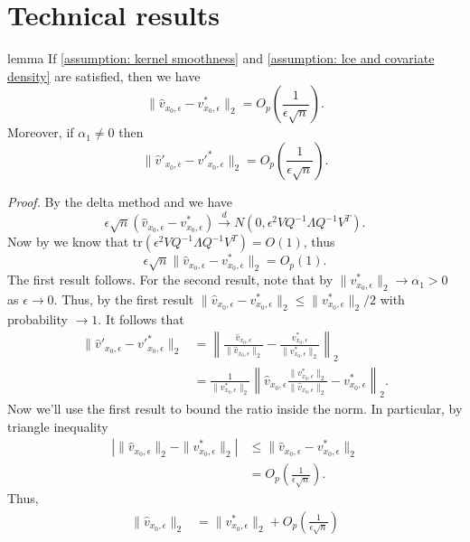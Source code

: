 \documentclass[11pt]{article}
\begin{document}
\section{Technical results}

\begin{restatable}{lemma}{} \label{lemma: scaled high prob bound for velocity}
    If \cref{assumption: kernel smoothness} and \cref{assumption: lce and covariate density} are satisfied, then we have 
    \[\|\hat{v}_{x_0, \epsilon} - v^*_{x_0, \epsilon}\|_2 = O_p\left(\frac{1}{\epsilon\sqrt{n}}\right).\]
    Moreover, if $\alpha_1 \neq 0$ then 
    \[\|\hat{v}'_{x_0, \epsilon} - v'^*_{x_0, \epsilon}\|_2 = O_p\left(\frac{1}{\epsilon\sqrt{n}}\right).\]
\end{restatable}
\noindent \textit{Proof.} By the delta method and  we have
\[\epsilon\sqrt{n}(\hat{v}_{x_0, \epsilon} - v^*_{x_0, \epsilon}) \overset{d}\rightarrow N(0, \epsilon^2VQ^{-1}\Lambda Q^{-1}V^T). \]
Now by  we know that $\text{tr}(\epsilon^2VQ^{-1}\Lambda Q^{-1}V^T) = O(1)$, thus
\[\epsilon\sqrt{n}\|\hat{v}_{x_0, \epsilon} - v^*_{x_0, \epsilon}\|_2 = O_p(1).\]
The first result follows. For the second result, note that by  $\|v^*_{x_0, \epsilon}\|_2 \rightarrow \alpha_1 > 0$ as $\epsilon \rightarrow 0$. Thus, by the first result $\|\hat{v}_{x_0, \epsilon} - v^*_{x_0, \epsilon}\|_2 \leq \|v^*_{x_0, \epsilon}\|_2/2$ with probability $\rightarrow 1$. It follows that 
\begin{align}
    \|\hat{v}'_{x_0, \epsilon} - v'^*_{x_0, \epsilon}\|_2 &= \left\|\frac{\hat{v}_{x_0, \epsilon}}{\|\hat{v}_{x_0, \epsilon}\|_2} - \frac{v^*_{x_0, \epsilon}}{\|v^*_{x_0, \epsilon}\|_2}\right\|_2 \\
    &= \frac{1}{\|v^*_{x_0, \epsilon}\|_2}\left\|\hat{v}_{x_0, \epsilon}\frac{\|v^*_{x_0, \epsilon}\|_2}{\|\hat{v}_{x_0, \epsilon}\|_2} - v^*_{x_0, \epsilon}\right\|_2.
\end{align}
Now we'll use the first result to bound the ratio inside the norm. In particular, by triangle inequality
\begin{align}
    \left|\|\hat{v}_{x_0, \epsilon}\|_2 - \|v^*_{x_0, \epsilon}\|_2\right| &\leq \|\hat{v}_{x_0, \epsilon} - v^*_{x_0, \epsilon}\|_2 \\
    &= O_p\left(\frac{1}{\epsilon\sqrt{n}}\right).
\end{align}
Thus,
\begin{align}
    \|\hat{v}_{x_0, \epsilon}\|_2 &= \|v^*_{x_0, \epsilon}\|_2 + O_p\left(\frac{1}{\epsilon\sqrt{n}}\right)
\end{align}
\end{document}
